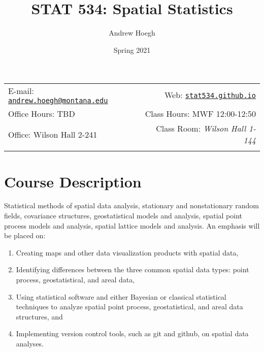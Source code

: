 \documentclass[11pt,]{article}
\title{STAT 534: Spatial Statistics}
\author{Andrew Hoegh}
\date{Spring 2021}
\begin{document}
  

		\maketitle
		
	
		\thispagestyle{firststyle}



	\noindent \begin{tabular*}{\textwidth}{ @{\extracolsep{\fill}} lr @{\extracolsep{\fill}}}


E-mail: \texttt{\href{mailto:andrew.hoegh@montana.edu}{\nolinkurl{andrew.hoegh@montana.edu}}} & Web: \href{http://stat534.github.io}{\tt stat534.github.io}\\
Office Hours: TBD  &  Class Hours: MWF 12:00-12:50\\
Office: Wilson Hall 2-241  & Class Room: \emph{Wilson Hall 1-144}\\
	&  \\
	\hline
	\end{tabular*}
	
\vspace{2mm}
	


\hypertarget{course-description}{%
\section{Course Description}\label{course-description}}

Statistical methods of spatial data analysis, stationary and
nonstationary random fields, covariance structures, geostatistical
models and analysis, spatial point process models and analysis, spatial
lattice models and analysis. An emphasis will be placed on:

\begin{enumerate}
\def\labelenumi{\arabic{enumi}.}
\item
  Creating maps and other data visualization products with spatial data,
\item
  Identifying differences between the three common spatial data types:
  point process, geostatistical, and areal data,
\item
  Using statistical software and either Bayesian or classical
  statistical techniques to analyze spatial point process,
  geostatistical, and areal data structures, and
\item
  Implementing version control tools, such as git and github, on spatial
  data analyses.
\end{enumerate}
\end{document}
